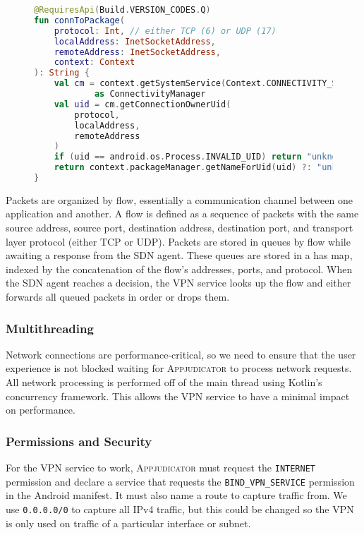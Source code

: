 \begin{figure}[h]
\begin{lstlisting}[caption={Getting the package that owns a connection.},
	label={lst:connToPackage}, language=Kotlin]
@RequiresApi(Build.VERSION_CODES.Q)
fun connToPackage(
    protocol: Int, // either TCP (6) or UDP (17)
    localAddress: InetSocketAddress,
    remoteAddress: InetSocketAddress,
    context: Context
): String {
	val cm = context.getSystemService(Context.CONNECTIVITY_SERVICE)
			as ConnectivityManager
	val uid = cm.getConnectionOwnerUid(
		protocol,
		localAddress,
		remoteAddress
	)
	if (uid == android.os.Process.INVALID_UID) return "unknown"
	return context.packageManager.getNameForUid(uid) ?: "unknown"
}
\end{lstlisting}
\end{figure}

Packets are organized by flow, essentially a communication channel between one
application and another. A flow is defined as a sequence of packets with the
same source address, source port, destination address, destination port, and
transport layer protocol (either TCP or UDP). Packets are stored in queues by
flow while awaiting a response from the SDN agent. These queues are stored in a
has map, indexed by the concatenation of the flow's addresses, ports, and
protocol. When the SDN agent reaches a decision, the VPN service looks up the
flow and either forwards all queued packets in order or drops them.

\subsubsection{Multithreading}
\label{sec:multithreading}

Network connections are performance-critical, so we need to ensure that the user
experience is not blocked waiting for \textsc{Appjudicator} to process network
requests. All network processing is performed off of the main thread using
Kotlin's concurrency framework. This allows the VPN service to have a minimal
impact on performance.

\subsubsection{Permissions and Security}
\label{sec:vpn-permissions}

For the VPN service to work, \textsc{Appjudicator} must request the
\texttt{INTERNET} permission and declare a service that requests the
\texttt{BIND\_VPN\_SERVICE} permission in the Android manifest. It must also
name a route to capture traffic from. We use \texttt{0.0.0.0/0} to capture all
IPv4 traffic, but this could be changed so the VPN is only used on traffic of a
particular interface or subnet.

